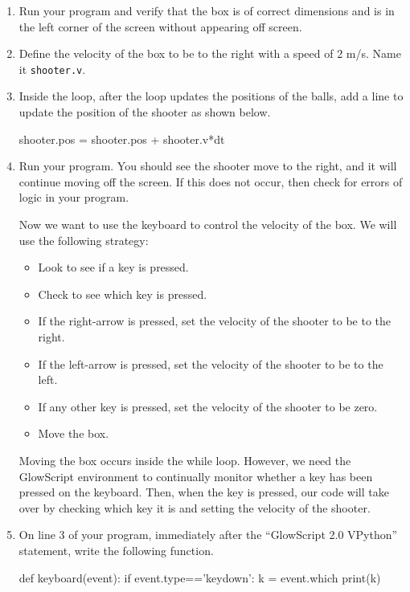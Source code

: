 \begin{enumerate}
	\item Run your program and verify that the box is of correct dimensions and is in the left corner of the screen without appearing off screen.
	
	\item Define the velocity of the box to be to the right with a speed of 2 m/s. Name it \texttt{shooter.v}.
	
	\item Inside the  loop, after the  loop updates the positions of the balls, add a line to update the position of the shooter as shown below.
	
\begin{myvpython}
    shooter.pos = shooter.pos + shooter.v*dt
\end{myvpython}

	\item Run your program. You should see the shooter move to the right, and it will continue moving off the screen. If this does not occur, then check for errors of logic in your program.

Now we want to use the keyboard to control the velocity of the box. We will use the following strategy:

\begin{itemize}
	\item Look to see if a key is pressed.
	\item Check to see which key is pressed.
	\item If the right-arrow is pressed, set the velocity of the shooter to be to the right.
	\item If the left-arrow is pressed, set the velocity of the shooter to be to the left.
	\item If any other key is pressed, set the velocity of the shooter to be zero.
	\item Move the box.
\end{itemize}

	Moving the box occurs inside the while loop. However, we need the GlowScript environment to continually monitor whether a key has been pressed on the keyboard. Then, when the key is pressed, our code will take over by checking which key it is and setting the velocity of the shooter.
	
	\item On line 3 of your program, immediately after the ``GlowScript 2.0 VPython'' statement, write the following function.

\begin{myvpython}
def keyboard(event):
    if event.type=='keydown':
        k = event.which
        print(k)
        

\end{myvpython}
\end{enumerate}
